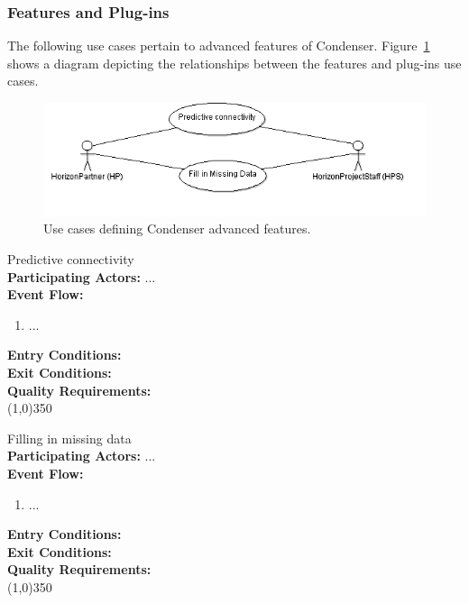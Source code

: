 \subsubsection{Features and Plug-ins}		
The following use cases pertain to advanced features of Condenser. Figure~\ref{FeaturesAndPluginsUse} shows a diagram depicting the relationships between the features and plug-ins use cases.
\begin{center}
	\begin{figure}[htbp]
		\includegraphics[scale=.5]{images/FeaturesAndPluginsUse.png}
		\caption{Use cases defining Condenser advanced features.\label{FeaturesAndPluginsUse}}
	\end{figure}
\end{center}	
 
	Predictive connectivity \\	 
	\textbf{Participating Actors:}  ... \\
	\textbf{Event Flow:}
	\begin{enumerate}
\item  ...
    \end{enumerate}
	\textbf{Entry Conditions:}\\
	\textbf{Exit Conditions:}\\
	\textbf{Quality Requirements:}\\
	\line(1,0){350}		
 
	Filling in missing data \\	 
	\textbf{Participating Actors:}  ... \\
	\textbf{Event Flow:}
	\begin{enumerate}
\item  ...
    \end{enumerate}
	\textbf{Entry Conditions:}\\
	\textbf{Exit Conditions:}\\
	\textbf{Quality Requirements:}\\
	\line(1,0){350}		

